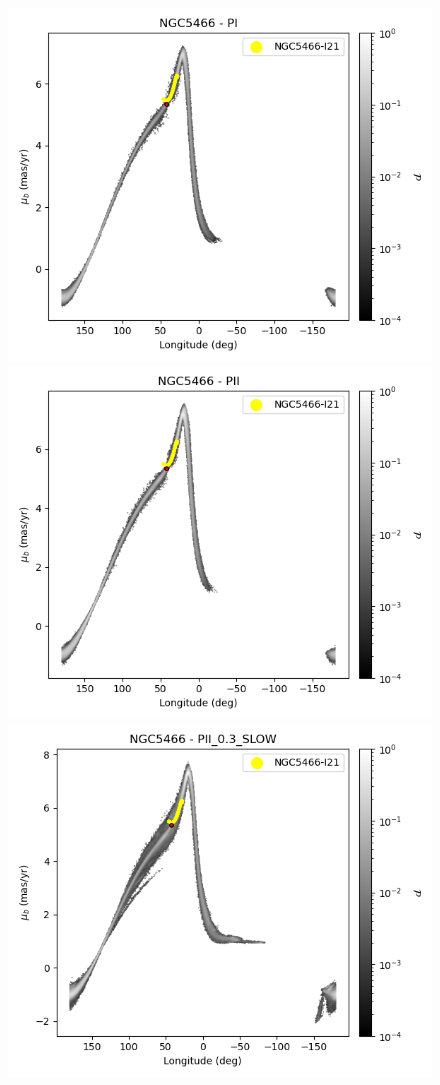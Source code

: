 \begin{figure}
\begin{center}
                    \includegraphics[clip=true, trim = 0mm 0mm 0mm 0mm, width=0.65\columnwidth]{images/PI_individual_NGC5466_galstream-NGC5466-l-pm_b.png}
                    \includegraphics[clip=true, trim = 0mm 0mm 0mm 0mm, width=0.65\columnwidth]{images/PII_individual_NGC5466_galstream-NGC5466-l-pm_b.png}
                    \includegraphics[clip=true, trim = 0mm 0mm 0mm 0mm, width=0.65\columnwidth]{images/PII_0.3_SLOW_individual_NGC5466_galstream-NGC5466-l-pm_b.png}


\end{center}
\end{figure}
